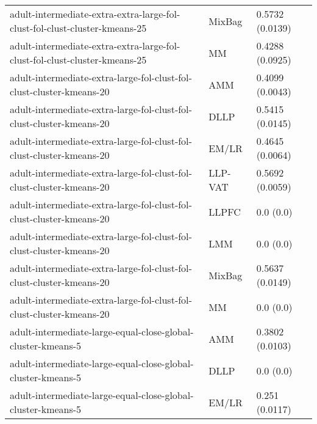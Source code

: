 \begin{longtable}{lll}
                                   adult-intermediate-extra-extra-large-fol-clust-fol-clust-cluster-kmeans-25 &    MixBag &                           0.5732 (0.0139) \\
                                   adult-intermediate-extra-extra-large-fol-clust-fol-clust-cluster-kmeans-25 &        MM &                           0.4288 (0.0925) \\
                                         adult-intermediate-extra-large-fol-clust-fol-clust-cluster-kmeans-20 &       AMM &                           0.4099 (0.0043) \\
                                         adult-intermediate-extra-large-fol-clust-fol-clust-cluster-kmeans-20 &      DLLP &                           0.5415 (0.0145) \\
                                         adult-intermediate-extra-large-fol-clust-fol-clust-cluster-kmeans-20 &     EM/LR &                           0.4645 (0.0064) \\
                                         adult-intermediate-extra-large-fol-clust-fol-clust-cluster-kmeans-20 &   LLP-VAT &                           0.5692 (0.0059) \\
                                         adult-intermediate-extra-large-fol-clust-fol-clust-cluster-kmeans-20 &     LLPFC &                                 0.0 (0.0) \\
                                         adult-intermediate-extra-large-fol-clust-fol-clust-cluster-kmeans-20 &       LMM &                                 0.0 (0.0) \\
                                         adult-intermediate-extra-large-fol-clust-fol-clust-cluster-kmeans-20 &    MixBag &                           0.5637 (0.0149) \\
                                         adult-intermediate-extra-large-fol-clust-fol-clust-cluster-kmeans-20 &        MM &                                 0.0 (0.0) \\
                                                 adult-intermediate-large-equal-close-global-cluster-kmeans-5 &       AMM &                           0.3802 (0.0103) \\
                                                 adult-intermediate-large-equal-close-global-cluster-kmeans-5 &      DLLP &                                 0.0 (0.0) \\
                                                 adult-intermediate-large-equal-close-global-cluster-kmeans-5 &     EM/LR &                            0.251 (0.0117) \\

\end{longtable}
